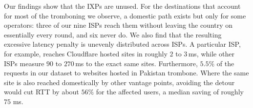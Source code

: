 \documentclass[sigconf,anonymous,10pt]{acmart}
\begin{document}






Our findings show that the IXPs are unused. For the destinations that account for most of the tromboning we observe, a domestic path exists but only for some operators: three of our nine ISPs reach them without leaving the country on essentially every round, and six never do. We also find that the resulting excessive latency penalty is unevenly distributed across ISPs. A particular ISP, for example, reaches Cloudflare hosted sites in roughly $2$ to $3$\,ms, while other ISPs measure $90$ to $270$\,ms to the exact same sites. Furthermore, $5.5\%$ of the requests in our dataset to websites hosted in Pakistan trombone. Where the same site is also reached domestically by other vantage points, avoiding the detour would cut RTT by about $56\%$ for the affected users, a median saving of roughly $75$ ms.
\end{document}
